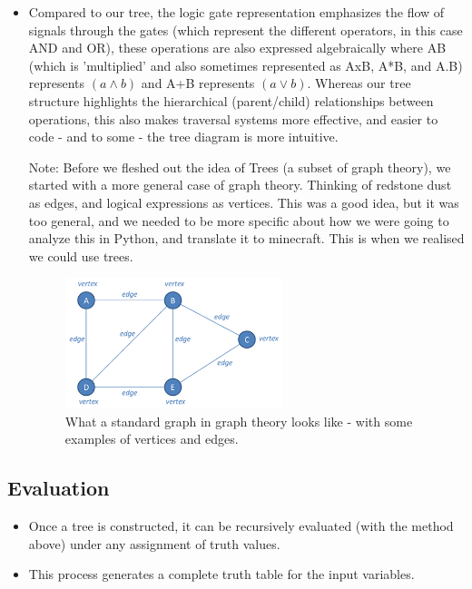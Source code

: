 \documentclass[11pt]{diazessay} %
\begin{document}
\begin{itemize}
\item Compared to our tree, the logic gate representation emphasizes the flow of signals through the gates (which represent the different operators, in this case AND and OR), these operations are also expressed algebraically where AB (which is 'multiplied' and also sometimes represented as AxB, A*B, and A.B) represents $(a \wedge b)$ and A+B represents $(a \vee b)$. Whereas our tree structure highlights the hierarchical (parent/child) relationships between operations, this also makes traversal systems more effective, and easier to code - and to some - the tree diagram is more intuitive.
\medskip

\subitem *Note: Before we fleshed out the idea of Trees (a subset of graph theory), we started with a more general case of graph theory. Thinking of redstone dust as edges, and logical expressions as vertices. This was a good idea, but it was too general, and we needed to be more specific about how we were going to analyze this in Python, and translate it to minecraft. This is when we realised we could use trees.
    \begin{figure}[h]
        \centering
        \includegraphics[width=0.6\textwidth]{gt.png}
        \caption{What a standard graph in graph theory looks like - with some examples of vertices and edges.}
        \label{fig:graph_theory_example}
    \end{figure}
\end{itemize}

\subsection*{Evaluation}
\begin{itemize}
    \item Once a tree is constructed, it can be recursively evaluated (with the method above) under any assignment of truth values.
    \item This process generates a complete truth table for the input variables.
\end{itemize}
\end{document}
